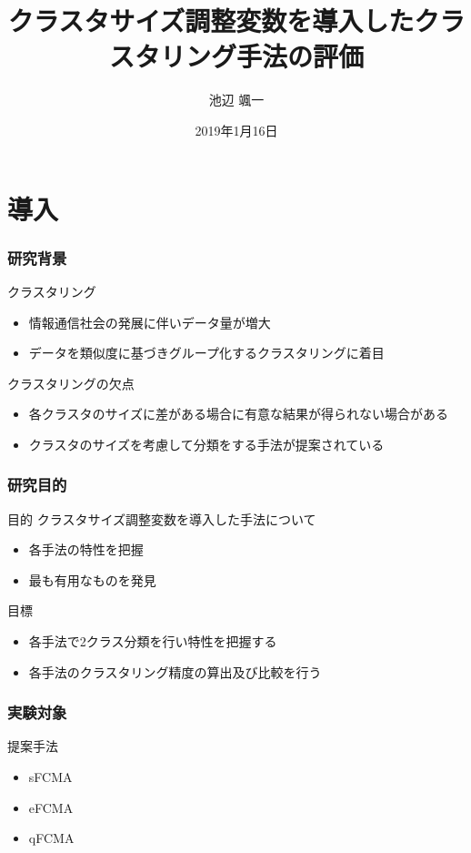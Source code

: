 \documentclass[13pt,dvipdfmx]{beamer}
\title[クラスタリング手法の評価]{クラスタサイズ調整変数を導入したクラスタリング手法の評価}
\author{池辺 颯一}
\institute[情報数理工学研究室]{情報数理工学研究室 \and af16009@shibaura-it.ac.jp}
\date{2019年1月16日}
\begin{document}
\begin{frame}\frametitle{}
  \titlepage
\end{frame}

\section{導入}
\begin{frame}\frametitle{研究背景}
 \begin{block}{クラスタリング}
  \begin{itemize}
   \item 情報通信社会の発展に伴いデータ量が増大
   \item データを類似度に基づきグループ化するクラスタリングに着目
  \end{itemize}
 \end{block}
 \begin{block}{クラスタリングの欠点}
  \begin{itemize}
   \item 各クラスタのサイズに差がある場合に有意な結果が得られない場合がある
   \item クラスタのサイズを考慮して分類をする手法が提案されている
  \end{itemize}
 \end{block}
\end{frame}

\begin{frame}\frametitle{研究目的}
  \begin{block}{目的}
   クラスタサイズ調整変数を導入した手法について
   \begin{itemize}
    \item 各手法の特性を把握
    \item 最も有用なものを発見
   \end{itemize}
  \end{block}
  \vspace{4mm}
  \begin{block}{目標}
    \begin{itemize}
    \item 各手法で2クラス分類を行い特性を把握する
    \item 各手法のクラスタリング精度の算出及び比較を行う
   \end{itemize}
  \end{block}
\end{frame}

\begin{frame}\frametitle{実験対象}
  \begin{block}{提案手法}
    \begin{itemize}
    \item sFCMA
    \item eFCMA
    \item qFCMA
    \end{itemize}
  \end{block}
\end{frame}
\end{document}
